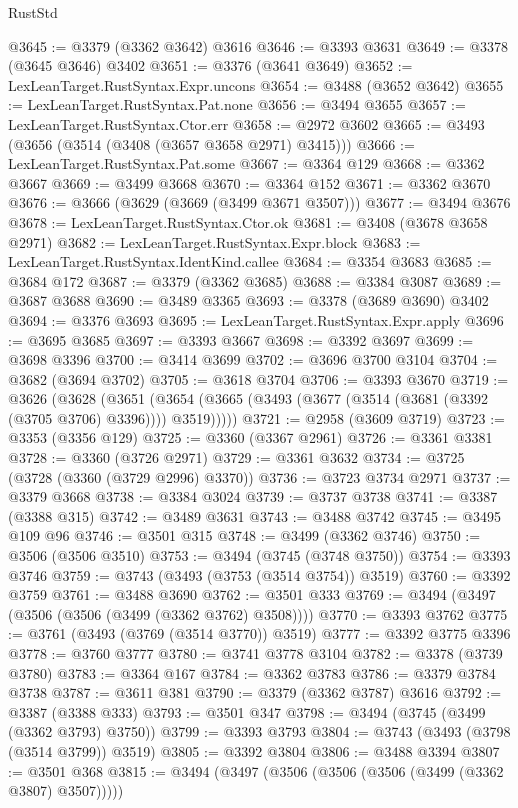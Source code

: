 \begin{lexlean}{RustStd}
\begin{coremodule}
@3645 := @3379 (@3362 @3642) @3616
@3646 := @3393 @3631
@3649 := @3378 (@3645 @3646) @3402
@3651 := @3376 (@3641 @3649)
@3652 := LexLeanTarget.RustSyntax.Expr.uncons
@3654 := @3488 (@3652 @3642)
@3655 := LexLeanTarget.RustSyntax.Pat.none
@3656 := @3494 @3655
@3657 := LexLeanTarget.RustSyntax.Ctor.err
@3658 := @2972 @3602
@3665 := @3493 (@3656 (@3514 (@3408 (@3657 @3658 @2971) @3415)))
@3666 := LexLeanTarget.RustSyntax.Pat.some
@3667 := @3364 @129
@3668 := @3362 @3667
@3669 := @3499 @3668
@3670 := @3364 @152
@3671 := @3362 @3670
@3676 := @3666 (@3629 (@3669 (@3499 @3671 @3507)))
@3677 := @3494 @3676
@3678 := LexLeanTarget.RustSyntax.Ctor.ok
@3681 := @3408 (@3678 @3658 @2971)
@3682 := LexLeanTarget.RustSyntax.Expr.block
@3683 := LexLeanTarget.RustSyntax.IdentKind.callee
@3684 := @3354 @3683
@3685 := @3684 @172
@3687 := @3379 (@3362 @3685)
@3688 := @3384 @3087
@3689 := @3687 @3688
@3690 := @3489 @3365
@3693 := @3378 (@3689 @3690) @3402
@3694 := @3376 @3693
@3695 := LexLeanTarget.RustSyntax.Expr.apply
@3696 := @3695 @3685
@3697 := @3393 @3667
@3698 := @3392 @3697
@3699 := @3698 @3396
@3700 := @3414 @3699
@3702 := @3696 @3700 @3104
@3704 := @3682 (@3694 @3702)
@3705 := @3618 @3704
@3706 := @3393 @3670
@3719 := @3626
    (@3628
      (@3651 (@3654 (@3665 (@3493 (@3677 (@3514 (@3681 (@3392 (@3705 @3706) @3396)))) @3519)))))
@3721 := @2958 (@3609 @3719)
@3723 := @3353 (@3356 @129)
@3725 := @3360 (@3367 @2961)
@3726 := @3361 @3381
@3728 := @3360 (@3726 @2971)
@3729 := @3361 @3632
@3734 := @3725 (@3728 (@3360 (@3729 @2996) @3370))
@3736 := @3723 @3734 @2971
@3737 := @3379 @3668
@3738 := @3384 @3024
@3739 := @3737 @3738
@3741 := @3387 (@3388 @315)
@3742 := @3489 @3631
@3743 := @3488 @3742
@3745 := @3495 @109 @96
@3746 := @3501 @315
@3748 := @3499 (@3362 @3746)
@3750 := @3506 (@3506 @3510)
@3753 := @3494 (@3745 (@3748 @3750))
@3754 := @3393 @3746
@3759 := @3743 (@3493 (@3753 (@3514 @3754)) @3519)
@3760 := @3392 @3759
@3761 := @3488 @3690
@3762 := @3501 @333
@3769 := @3494 (@3497 (@3506 (@3506 (@3499 (@3362 @3762) @3508))))
@3770 := @3393 @3762
@3775 := @3761 (@3493 (@3769 (@3514 @3770)) @3519)
@3777 := @3392 @3775 @3396
@3778 := @3760 @3777
@3780 := @3741 @3778 @3104
@3782 := @3378 (@3739 @3780)
@3783 := @3364 @167
@3784 := @3362 @3783
@3786 := @3379 @3784 @3738
@3787 := @3611 @381
@3790 := @3379 (@3362 @3787) @3616
@3792 := @3387 (@3388 @333)
@3793 := @3501 @347
@3798 := @3494 (@3745 (@3499 (@3362 @3793) @3750))
@3799 := @3393 @3793
@3804 := @3743 (@3493 (@3798 (@3514 @3799)) @3519)
@3805 := @3392 @3804
@3806 := @3488 @3394
@3807 := @3501 @368
@3815 := @3494 (@3497 (@3506 (@3506 (@3506 (@3499 (@3362 @3807) @3507)))))

\end{coremodule}
\end{lexlean}
